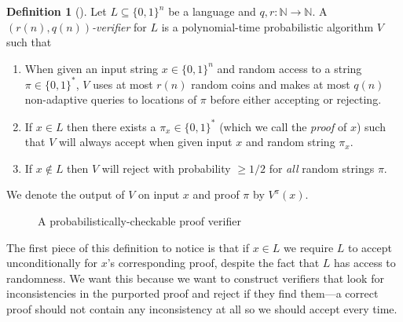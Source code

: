 \documentclass[english,12pt]{reedthesis}
\theoremstyle{plain}
\theoremstyle{definition}
\newtheorem{defn}[defn]{Definition}
\theoremstyle{remark}
\begin{document}
\begin{defn}[{\cite[Def.\ 18.1]{AB09}}]\label{def:prob-check}
  Let $L \subseteq \{0, 1\}^{n}$ be a language and $q, r\colon \mathbb{N} \rightarrow \mathbb{N}$. A
  \emph{$(r(n), q(n))$-verifier} for $L$ is a polynomial-time probabilistic
  algorithm $V$ such that
  \begin{enumerate}
    \item When given an input string $x \in \{0, 1\}^{n}$ and random access to a
          string $\pi \in \{0, 1\}^{*}$, $V$ uses at most $r(n)$ random coins and
          makes at most $q(n)$ non-adaptive queries to locations of $\pi$ before
          either accepting or rejecting.
    \item If $x \in L$ then there exists a $\pi_{x} \in \{0, 1\}^{*}$ (which we call
          the \emph{proof} of $x$) such that $V$ will always accept when given
          input $x$ and random string $\pi_{x}$.
    \item If $x \notin L$ then $V$ will reject with probability $\ge 1/2$ for
          \emph{all} random strings $\pi$.
  \end{enumerate}
  We denote the output of $V$ on input $x$ and proof $\pi$ by $V^{\pi}(x)$.
\end{defn}

\begin{figure}
  \centering
  \caption{A probabilistically-checkable proof verifier}\label{fig:pcp}
\end{figure}

The first piece of this definition to notice is that if $x \in L$ we require $L$
to accept unconditionally for $x$'s corresponding proof, despite the fact that
$L$ has access to randomness. We want this because we want to construct
verifiers that look for inconsistencies in the purported proof and reject if
they find them---a correct proof should not contain any inconsistency at all so we
should accept every time.
\end{document}
